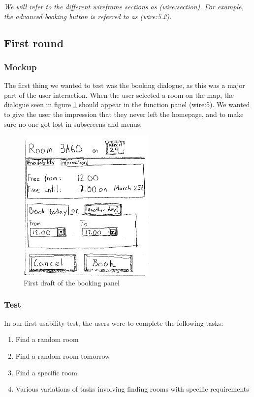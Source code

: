 \emph{We will refer to the different wireframe sections as (wire:section). For example, the advanced booking button is referred to as (wire:5.2).} 

\subsection{First round}
\subsubsection{Mockup}
\label{sub:first_mockup}
The first thing we wanted to test was the booking dialogue, as this was a major part of the user interaction. When the user selected a room on the map, the dialogue seen in figure \ref{fig:book_room_mockup} should appear in the function panel (wire:5).
 We wanted to give the user the impression that they never left the homepage, and to make sure no-one got lost in subscreens and menus.
\begin{figure}[htb]
\begin{center}
\leavevmode
\includegraphics[width=0.6\textwidth]{images/bookRoomMockup}
\end{center}
\caption{First draft of the booking panel}
\label{fig:book_room_mockup}
\end{figure}

\subsubsection{Test}
\label{mock1:test}
In our first usability test, the users were to complete the following tasks:

\begin{enumerate}
	\item Find a random room
	\item Find a random room tomorrow
	\item Find a specific room
	\item Various variations of tasks involving finding rooms with specific requirements
\end{enumerate}

